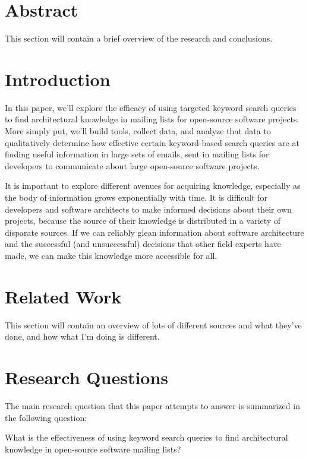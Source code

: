 \documentclass[a4paper, 12pt]{article}
\begin{document}


\section{Abstract}
	This section will contain a brief overview of the research and conclusions.



\section{Introduction}
	In this paper, we'll explore the efficacy of using targeted keyword search queries to find architectural knowledge in mailing lists for open-source software projects. More simply put, we'll build tools, collect data, and analyze that data to qualitatively determine how effective certain keyword-based search queries are at finding useful information in large sets of emails, sent in mailing lists for developers to communicate about large open-source software projects.
	
	It is important to explore different avenues for acquiring knowledge, especially as the body of information grows exponentially with time. It is difficult for developers and software architects to make informed decisions about their own projects, because the source of their knowledge is distributed in a variety of disparate sources. If we can reliably glean information about software architecture and the successful (and unsuccessful) decisions that other field experts have made, we can make this knowledge more accessible for all.
	
\section{Related Work}
	This section will contain an overview of lots of different sources and what they've done, and how what I'm doing is different.

\section{Research Questions}
	The main research question that this paper attempts to answer is summarized in the following question:
	
	\begin{center}
		\large What is the effectiveness of using keyword search queries to find architectural knowledge in open-source software mailing lists?
	\end{center}
	
\end{document}
